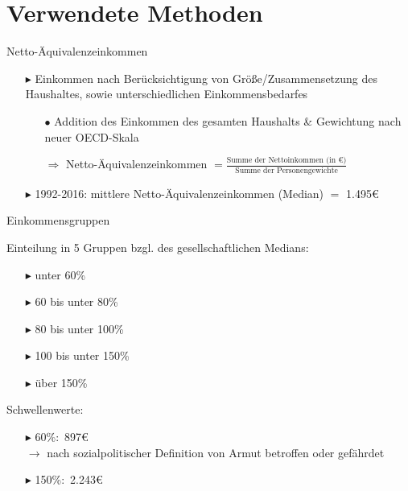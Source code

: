 \documentclass{beamer}
\begin{document}
\section{Verwendete Methoden}
\begin{frame}{Netto-Äquivalenzeinkommen}
	\begin{itemize}
		\item[$\blacktriangleright$] Einkommen nach Berücksichtigung von Größe/Zusammensetzung des Haushaltes, sowie unterschiedlichen Einkommensbedarfes
\vspace{0.3cm}		
		\begin{itemize}
		\item[$\bullet$]	Addition des Einkommen des gesamten Haushalts \& Gewichtung nach neuer OECD-Skala
\vspace{0.2cm}
		\item[$\Rightarrow$] Netto-Äquivalenzeinkommen $=\frac{\text{Summe der Nettoinkommen (in €)}}{\text{Summe der Personengewichte}}$
		\end{itemize}
\vspace{0.3cm}
		\item[$\blacktriangleright$] 1992-2016: mittlere Netto-Äquivalenzeinkommen (Median) $=$ 1.495€
	\end{itemize}
\end{frame}

\begin{frame}{Einkommensgruppen}
	\begin{block}{Einteilung in 5 Gruppen bzgl. des gesellschaftlichen Medians:}
		\begin{itemize}
			\item[$\blacktriangleright$] unter 60\%
			\item[$\blacktriangleright$] 60 bis unter 80\%
			\item[$\blacktriangleright$] 80 bis unter 100\%
			\item[$\blacktriangleright$] 100 bis unter 150\%
			\item[$\blacktriangleright$] über 150\%
		\end{itemize}
	\end{block}
	\begin{block}{Schwellenwerte:}
		\begin{itemize}
			\item[$\blacktriangleright$] 60\%:\, 897€ \\ $\rightarrow$ nach sozialpolitischer Definition von Armut betroffen oder gefährdet
			\item[$\blacktriangleright$] 150\%:\, 2.243€
		\end{itemize}
	\end{block}
\end{frame}
\end{document}
